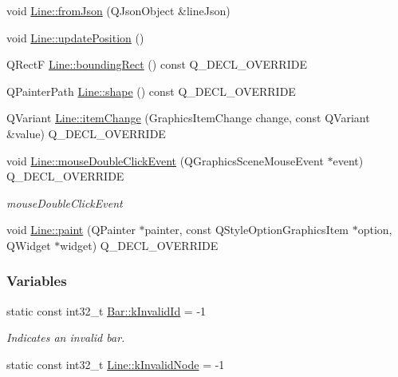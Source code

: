\begin{DoxyCompactItemize}
\item 
void \hyperlink{group___models_ga62623ad71df5279377cc69da90decc75}{Line\+::from\+Json} (Q\+Json\+Object \&line\+Json)
\item 
void \hyperlink{group___models_ga8fdb12651d4bc592616d241386b066b3}{Line\+::update\+Position} ()
\item 
Q\+Rect\+F \hyperlink{group___models_gad15c3af158d3b966c04be7e18cee5aea}{Line\+::bounding\+Rect} () const Q\+\_\+\+D\+E\+C\+L\+\_\+\+O\+V\+E\+R\+R\+I\+D\+E
\item 
Q\+Painter\+Path \hyperlink{group___models_gaf1736b829a643d99052ef6428ddd5b16}{Line\+::shape} () const Q\+\_\+\+D\+E\+C\+L\+\_\+\+O\+V\+E\+R\+R\+I\+D\+E
\item 
Q\+Variant \hyperlink{group___models_ga5fcee3f23eb50e34f730d602a3802b93}{Line\+::item\+Change} (Graphics\+Item\+Change change, const Q\+Variant \&value) Q\+\_\+\+D\+E\+C\+L\+\_\+\+O\+V\+E\+R\+R\+I\+D\+E
\item 
void \hyperlink{group___models_ga9a1fee5b1606ab0deedd04bdab99be70}{Line\+::mouse\+Double\+Click\+Event} (Q\+Graphics\+Scene\+Mouse\+Event $\ast$event) Q\+\_\+\+D\+E\+C\+L\+\_\+\+O\+V\+E\+R\+R\+I\+D\+E
\begin{DoxyCompactList}\small\item\em mouse\+Double\+Click\+Event \end{DoxyCompactList}\item 
void \hyperlink{group___models_ga0aa64aed379d434be5942edf572b444b}{Line\+::paint} (Q\+Painter $\ast$painter, const Q\+Style\+Option\+Graphics\+Item $\ast$option, Q\+Widget $\ast$widget) Q\+\_\+\+D\+E\+C\+L\+\_\+\+O\+V\+E\+R\+R\+I\+D\+E
\end{DoxyCompactItemize}
\subsubsection*{Variables}
\begin{DoxyCompactItemize}
\item 
static const int32\+\_\+t \hyperlink{group___models_ga9919592c0397ed41448dfb20b607d738}{Bar\+::k\+Invalid\+Id} = -\/1
\begin{DoxyCompactList}\small\item\em Indicates an invalid bar. \end{DoxyCompactList}\item 
static const int32\+\_\+t \hyperlink{group___models_gadc334bd07c6126abc56e531d7e3e72b4}{Line\+::k\+Invalid\+Node} = -\/1
\end{DoxyCompactItemize}


